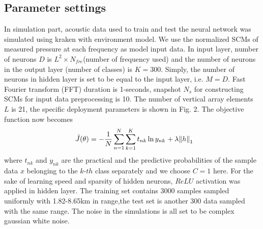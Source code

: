 \subsection{Parameter settings}
In simulation part, acoustic data used to train and test the neural network was simulated using kraken\cite{porter1992kraken} with environment model.  We use the normalized SCMs of measured pressure at each frequency as model input data. In input layer, number of neurons $D$ is $L^{2} \times N_{fre}$(number of frequency used) and the number of neurons in the output layer (number of classes) is $K = 300$. Simply, the number of neurons in hidden layer is set to be equal to the input layer, i.e. $M = D$. Fast	Fourier	transform (FFT) duration is 1-seconds, snapshot $N_{s}$ for constructing SCMs for input data preprocessing is 10. The number of vertical array elements $L$ is 21, the specific deployment parameters is shown in Fig. 2.
The objective function now becomes
\begin{equation}
{\kern 1pt} {\kern 1pt} {\kern 1pt} {\kern 1pt} {\kern 1pt} {\kern 1pt} \tilde J(\theta ){\kern 1pt} {\kern 1pt} {\kern 1pt} {\rm{ = }}{\kern 1pt} {\kern 1pt} {\kern 1pt} {\rm{ - }}{{\rm{1}} \over N}\sum\limits_{n = 1}^N {\sum\limits_{k = 1}^K {{t_{nk}}\ln {y_{nk}}{\kern 1pt} {\kern 1pt} {\kern 1pt} {\rm{ + }}{\kern 1pt} {\kern 1pt} \lambda {{\left\| h \right\|}_1}} }
\end{equation}
where $t_{nk}$ and $y_{nk}$ are the practical and the predictive probabilities of the sample data $x$ belonging to the $k$-$th$ class separately and we choose $C=1$ here.
For the sake of learning speed and sparsity of hidden neurons, $ReLU$ activation\cite{goodfellow2016deep} was applied in hidden layer.
The training set contains 3000 samples sampled uniformly with 1.82\--8.65km in range,the test set is another 300 data sampled with the same range. The noise in the simulations is all set to be complex gaussian white noise.

